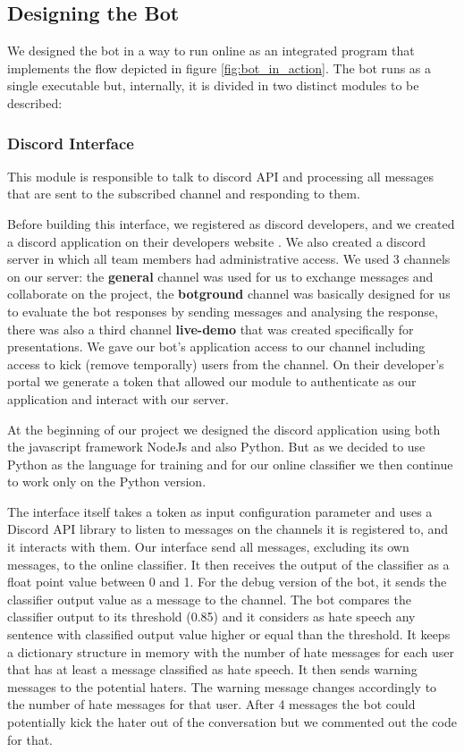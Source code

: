\documentclass[conference]{sig-alternate-05-2015}
\begin{document}
\subsection{Designing the Bot}

We designed the bot in a way to run online as an integrated program that implements the flow depicted in figure \ref{fig:bot_in_action}. The bot runs as a single executable but, internally, it is divided in two distinct modules to be described: 
\subsubsection{Discord Interface}
    This module is responsible to talk to discord API and processing all messages that are sent to the subscribed channel and responding to them. 
    
    Before building this interface, we registered as discord developers, and we created a discord application on their developers website \cite{DiscordDevelopers}. We also created a discord server in which all team members had administrative access. We used 3 channels on our server: the \textbf{general} channel was used for us to exchange messages and collaborate on the project, the \textbf{botground} channel was basically designed for us to evaluate the bot responses by sending messages and analysing the response, there was also a third channel \textbf{live-demo} that was created specifically for presentations. We gave our bot's application access to our channel including access to kick (remove temporally) users from the channel. On their developer's portal we generate a token that allowed our module to authenticate as our application and interact with our server.
    
    At the beginning of our project we designed the discord application using both the javascript framework NodeJs and also Python. But as we decided to use Python as the language for training and for our online classifier we then continue to work only on the Python version.
    
    The interface itself takes a token as input configuration parameter and uses a Discord API library to listen to messages on the channels it is registered to, and it interacts with them. Our interface send all messages, excluding its own messages, to the online classifier. It then receives the output of the classifier as a float point value between 0 and 1. For the debug version of the bot, it sends the classifier output value as a message to the channel. The bot compares the classifier output to its threshold (0.85) and it considers as hate speech any sentence with classified output value higher or equal than the threshold. It keeps a dictionary structure in memory with the number of hate messages for each user that has at least a message classified as hate speech. It then sends warning messages to the potential haters. The warning message changes accordingly to the number of hate messages for that user. After 4 messages the bot could potentially kick the hater out of the conversation but we commented out the code for that.
    
\end{document}
